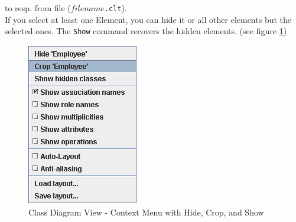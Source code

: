 \documentclass[a4paper,titlepage,oneside,final]{scrreprt} %
\begin{document}
to resp. from file ($\mathit{filename}$\verb+.clt+).\\
If you select at least one Element, you can hide it or
all other elements but the selected ones. The \verb+Show+
command recovers the hidden elements. (see figure \ref{fig:ClassDiagramViewHideCrop})
\begin{figure}[ht]
\centering
\includegraphics[scale=0.7]{Screenshots/GUI/Views/ClassDiagramViewHideCrop.png}
\caption{Class Diagram View - Context Menu with Hide, Crop, and Show}
\label{fig:ClassDiagramViewHideCrop}
\end{figure}
\end{document}

